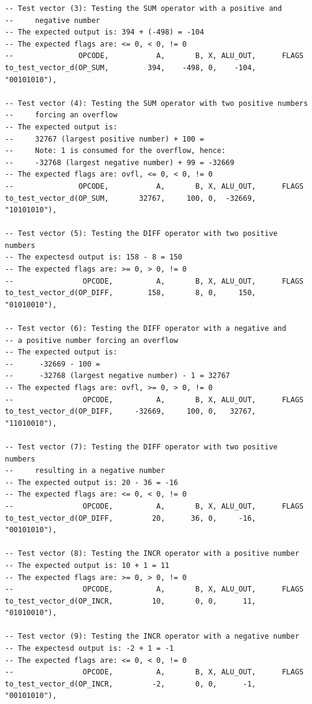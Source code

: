 \documentclass[10pt]{article}
\begin{document}
\begin{verbatim}
-- Test vector (3): Testing the SUM operator with a positive and 
--     negative number
-- The expected output is: 394 + (-498) = -104
-- The expected flags are: <= 0, < 0, != 0
--               OPCODE,           A,       B, X, ALU_OUT,      FLAGS
to_test_vector_d(OP_SUM,         394,    -498, 0,    -104, "00101010"),

-- Test vector (4): Testing the SUM operator with two positive numbers 
--     forcing an overflow
-- The expected output is:  
--     32767 (largest positive number) + 100 =    
--     Note: 1 is consumed for the overflow, hence:     
--     -32768 (largest negative number) + 99 = -32669
-- The expected flags are: ovfl, <= 0, < 0, != 0
--               OPCODE,           A,       B, X, ALU_OUT,      FLAGS
to_test_vector_d(OP_SUM,       32767,     100, 0,  -32669, "10101010"),

-- Test vector (5): Testing the DIFF operator with two positive numbers
-- The expectesd output is: 158 - 8 = 150
-- The expected flags are: >= 0, > 0, != 0 
--                OPCODE,          A,       B, X, ALU_OUT,      FLAGS
to_test_vector_d(OP_DIFF,        158,       8, 0,     150, "01010010"),
     
-- Test vector (6): Testing the DIFF operator with a negative and 
-- a positive number forcing an overflow
-- The expected output is: 
--      -32669 - 100 = 
--      -32768 (largest negative number) - 1 = 32767
-- The expected flags are: ovfl, >= 0, > 0, != 0 
--                OPCODE,          A,       B, X, ALU_OUT,      FLAGS
to_test_vector_d(OP_DIFF,     -32669,     100, 0,   32767, "11010010"),

-- Test vector (7): Testing the DIFF operator with two positive numbers 
--     resulting in a negative number
-- The expected output is: 20 - 36 = -16
-- The expected flags are: <= 0, < 0, != 0
--                OPCODE,          A,       B, X, ALU_OUT,      FLAGS
to_test_vector_d(OP_DIFF,         20,      36, 0,     -16, "00101010"),

-- Test vector (8): Testing the INCR operator with a positive number
-- The expected output is: 10 + 1 = 11
-- The expected flags are: >= 0, > 0, != 0
--                OPCODE,          A,       B, X, ALU_OUT,      FLAGS
to_test_vector_d(OP_INCR,         10,       0, 0,      11, "01010010"),

-- Test vector (9): Testing the INCR operator with a negative number
-- The expectesd output is: -2 + 1 = -1 
-- The expected flags are: <= 0, < 0, != 0
--                OPCODE,          A,       B, X, ALU_OUT,      FLAGS
to_test_vector_d(OP_INCR,         -2,       0, 0,      -1, "00101010"),


\end{verbatim}
\end{document}
